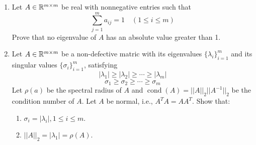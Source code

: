 \documentclass{article}
\DeclareMathOperator{\cond}{cond}
\begin{document}
\begin{enumerate}
\begin{proof}
    First, since $A$ is real and symmetric, we can decompose $A$ into an eigenvector matrix, full with orthonormal eigenvectors which form a basis for $\R^m$ and a diagonal matrix with eigenvalues of $A$ on the diagonal. Since its columns form a basis for $\R^m$ we have that we can express y as a linear combination of the eigenvectors of v: $y = c_1 v_1 + \cdots + c_m v_m$. We now define $\lambda_*$ such that, $|\lambda_*| \ge |\lambda_i|, \forall \lambda_i \in \Lambda(A), c_* \neq 0$.  
\[
    A = VDV^{-1}, \quad y = c_* v_* + c_1 v_1 + \cdots + c_m v_m
\]
\[
    A^n = VD^nV^{-1},\quad A^ny = c_*\lambda_*^n v_* + c_1\lambda_1^nv_1 + \cdots + c_m\lambda_m^nv_m
\]
\[
   A^ny = \lambda_*^n\left(c_* v_* + c_1\frac{\lambda_1^n}{\lambda_*^n} v_1 + \cdots + c_m\frac{\lambda_m^n}{\lambda_*^n}v_m\right)
\]
Note from our definition of $\lambda_*$ we either have that $|\lambda_*| \ge |\lambda_i| \bigvee \left(|\lambda_* < |\lambda_i| \bigwedge c_i = 0\right)$. Thereby, we have that 
\[
    \lim_{n\to \infty} A^ny = \lambda_*^nc_*v_*
\]
Therefore we have, 
\[
    \lim_{k \to \infty} \frac{y^TA^{k+1}y}{y^TA^ky} = \frac{\lambda_*^{k+1} c_* y^Tv_*}{\lambda_*^k c_* y^Tv_*} = \lambda_*
\]
Where $\lambda_*$ is the largest eigenvalue of $A$ which has an eigenvector as part of the expansion of $y$ into the basis of the eigenvectors of $A$. 
\end{proof}


\item %
Let $A \in \mathbb{R}^{m\times m}$ be real with nonnegative entries such that 
\[
    \sum_{j=1}^m a_{ij} = 1 \quad (1\le i \le m)
\]
Prove that no eigenvalue of $A$ has an absolute value greater than 1.

\item %
Let $A \in \mathbb{R}^{m\times m}$ be a non-defective matric with its eigenvalues $\{\lambda_i\}_{i=1}^m$ and its singular values $\{\sigma_i\}_{i=1}^m$, satisfying
\[
    |\lambda_1| \ge |\lambda_2| \ge \cdots \ge |\lambda_m|
\]
\[
    \sigma_1 \ge \sigma_2 \ge \cdots \ge \sigma_m
\]
Let $\rho(a)$ be the spectral radius of $A$ and $\cond(A) = ||A||_2||A^{-1}||_2$ be the condition number of $A$. Let $A$ be normal, i.e., $A^TA = AA^T$. Show that: 
\begin{enumerate}
\item $\sigma_i = |\lambda_i|, 1 \le i \le m$.

\item $||A||_2 = |\lambda_1| = \rho(A)$. 
\end{enumerate}



\end{enumerate}
\end{document}
